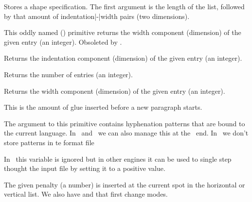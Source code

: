 \stopnewprimitive

\startoldprimitive[title={\prm {parshape}}]

Stores a shape specification. The first argument is the length of the list,
followed by that amount of indentation|-|width pairs (two dimensions).

\stopoldprimitive

\startoldprimitive[title={\prm {parshapedimen}}]

This oddly named (\ETEX) primitive returns the width component (dimension) of the
given entry (an integer). Obsoleted by .

\stopoldprimitive

\startoldprimitive[title={\prm {parshapeindent}}]

Returns the indentation component (dimension) of the given entry (an integer).

\stopoldprimitive

\startoldprimitive[title={\prm {parshapelength}}]

Returns the number of entries (an integer).

\stopoldprimitive

\startnewprimitive[title={\prm {parshapewidth}}]

Returns the width component (dimension) of the given entry (an integer).

\stopnewprimitive

\startoldprimitive[title={\prm {parskip}}]

This is the amount of glue inserted before a new paragraph starts.

\stopoldprimitive

\startoldprimitive[title={\prm {patterns}}]

The argument to this primitive contains hyphenation patterns that are bound to
the current language. In \LUATEX\ and \LUAMETATEX\ we can also manage this at the
\LUA\ end. In \LUAMETATEX\ we don't store patterns in te format file

\stopoldprimitive

\startoldprimitive[title={\prm {pausing}}][obsolete=yes]

In \LUAMETATEX\ this variable is ignored but in other engines it can be used to
single step thought the input file by setting it to a positive value.

\stopoldprimitive

\startoldprimitive[title={\prm {penalty}}]

The given penalty (a number) is inserted at the current spot in the horizontal or
vertical list. We also have  and  that first change
modes.

